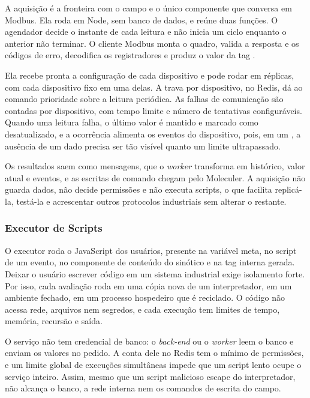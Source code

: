 \par A aquisição é a fronteira com o campo e o único componente que conversa em Modbus. Ela roda em Node, sem banco de dados, e reúne duas funções. O agendador decide o instante de cada leitura e não inicia um ciclo enquanto o anterior não terminar. O cliente Modbus monta o quadro, valida a resposta e os códigos de erro, decodifica os registradores e produz o valor da tag \cite{MODBUS_TCP_IMPLEMENTATION_GUIDE}.

\par Ela recebe pronta a configuração de cada dispositivo e pode rodar em réplicas, com cada dispositivo fixo em uma delas. A trava por dispositivo, no Redis, dá ao comando prioridade sobre a leitura periódica. As falhas de comunicação são contadas por dispositivo, com tempo limite e número de tentativas configuráveis. Quando uma leitura falha, o último valor é mantido e marcado como desatualizado, e a ocorrência alimenta os eventos do dispositivo, pois, em um , a ausência de um dado precisa ser tão visível quanto um limite ultrapassado.

\par Os resultados saem como mensagens, que o \emph{worker} transforma em histórico, valor atual e eventos, e as escritas de comando chegam pelo Moleculer. A aquisição não guarda dados, não decide permissões e não executa scripts, o que facilita replicá-la, testá-la e acrescentar outros protocolos industriais sem alterar o restante.

\subsubsection{Executor de Scripts}

\par O executor roda o JavaScript dos usuários, presente na variável meta, no script de um evento, no componente de conteúdo do sinótico e na tag interna gerada. Deixar o usuário escrever código em um sistema industrial exige isolamento forte. Por isso, cada avaliação roda em uma cópia nova de um interpretador, em um ambiente fechado, em um processo hospedeiro que é reciclado. O código não acessa rede, arquivos nem segredos, e cada execução tem limites de tempo, memória, recursão e saída.

\par O serviço não tem credencial de banco: o \emph{back-end} ou o \emph{worker} leem o banco e enviam os valores no pedido. A conta dele no Redis tem o mínimo de permissões, e um limite global de execuções simultâneas impede que um script lento ocupe o serviço inteiro. Assim, mesmo que um script malicioso escape do interpretador, não alcança o banco, a rede interna nem os comandos de escrita do campo.

